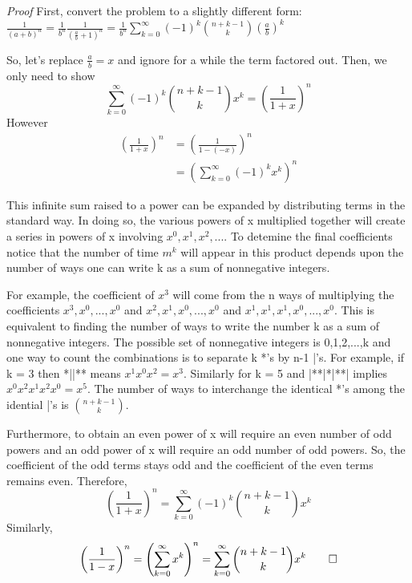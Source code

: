 \documentclass[10pt,]{book}
\makeatletter
\renewcommand*{\proofname}{Proof}
\renewenvironment{proof}[1][\proofname]{\par
  \pushQED{\qed}%
  \normalfont \topsep6\p@\@plus6\p@\relax
  \trivlist
  \item\relax
    {\itshape
    #1\@addpunct{.}}\hspace\labelsep\ignorespaces
}{%
  \popQED\endtrivlist\@endpefalse
}
\numberwithin{equation}{section}
\makeatother
\begin{document}
\begin{proof}\hypertarget{proof-48}{}
\hypertarget{p-958}{}%
First, convert the problem to a slightly different form: \(\frac{1}{(a+b)^n} = \frac{1}{b^n} \frac{1}{(\frac{a}{b}+1)^n} 
= \frac{1}{b^n} \sum_{k=0}^{\infty} {(-1)^k \binom{n + k - 1}{k} \left ( \frac{a}{b} \right ) ^k}\)%
\par
\hypertarget{p-959}{}%
So, let's replace \(\frac{a}{b} = x\) and ignore for a while the term factored out. Then, we only need to show%
\begin{equation*}
\sum_{k=0}^{\infty} {(-1)^k \binom{n + k - 1}{k} x^k} = \left ( \frac{1}{1+x} \right )^n 
\end{equation*}
However%
\begin{align*}
\left ( \frac{1}{1+x} \right )^n & = \left ( \frac{1}{1 - (-x)} \right )^n \\
& = \left ( \sum_{k=0}^{\infty} {(-1)^k x^k} \right )^n
\end{align*}
%
\par
\hypertarget{p-960}{}%
This infinite sum raised to a power can be expanded by distributing terms in the standard way. In doing so, the various powers of x multiplied together will create a series in powers of x involving \(x^0, x^1, x^2, ...\). To detemine the final coefficients notice that the number of time \(m^k\) will appear in this product depends upon the number of ways one can write k as a sum of nonnegative integers.%
\par
\hypertarget{p-961}{}%
For example, the coefficient of \(x^3\) will come from the n ways of multiplying the coefficients \(x^3, x^0, ..., x^0\) and \(x^2, x^1, x^0, ..., x^0\) and \(x^1, x^1, x^1, x^0,..., x^0\). This is equivalent to finding the number of ways to write the number k as a sum of nonnegative integers. The possible set of nonnegative integers is {0,1,2,...,k} and one way to count the combinations is to separate k *'s by n-1 |'s.  For example, if k = 3 then *||** means \(x^1 x^0 x^2 = x^3\). Similarly for k = 5 and |**|*|**| implies \(x^0 x^2 x^1 x^2 x^0 = x^5\).  The number of ways to interchange the identical *'s among the idential |'s is \(\binom{n+k-1}{k}\).%
\par
\hypertarget{p-962}{}%
Furthermore, to obtain an even power of x will require an even number of odd powers and an odd power of x will require an odd number of odd powers. So, the coefficient of the odd terms stays odd and the coefficient of the even terms remains even. Therefore,%
\begin{equation*}
\left ( \frac{1}{1+x} \right )^n = \sum_{k=0}^{\infty} {(-1)^k \binom{n + k - 1}{k} x^k}
\end{equation*}
Similarly,%
\begin{equation*}
\left ( \frac{1}{1-x} \right )^n = \left ( \sum_{k=0}^{\infty} {x^k} \right )^n = \sum_{k=0}^{\infty} {\binom{n + k - 1}{k} x^k}\qedhere
\end{equation*}
%
\end{proof}
\end{document}
